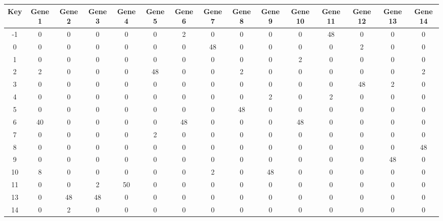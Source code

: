 \begin{tabular}{|c|c|c|c|c|c|c|c|c|c|c|c|c|c|c|}
\hline
Key & Gene 1 & Gene 2 & Gene 3 & Gene 4 & Gene 5 & Gene 6 & Gene 7 & Gene 8 & Gene 9 & Gene 10 & Gene 11 & Gene 12 & Gene 13 & Gene 14 \\
\hline
-1 & 0 & 0 & 0 & 0 & 0 & 2 & 0 & 0 & 0 & 0 & 48 & 0 & 0 & 0 \\
0 & 0 & 0 & 0 & 0 & 0 & 0 & 48 & 0 & 0 & 0 & 0 & 2 & 0 & 0 \\
1 & 0 & 0 & 0 & 0 & 0 & 0 & 0 & 0 & 0 & 2 & 0 & 0 & 0 & 0 \\
2 & 2 & 0 & 0 & 0 & 48 & 0 & 0 & 2 & 0 & 0 & 0 & 0 & 0 & 2 \\
3 & 0 & 0 & 0 & 0 & 0 & 0 & 0 & 0 & 0 & 0 & 0 & 48 & 2 & 0 \\
4 & 0 & 0 & 0 & 0 & 0 & 0 & 0 & 0 & 2 & 0 & 2 & 0 & 0 & 0 \\
5 & 0 & 0 & 0 & 0 & 0 & 0 & 0 & 48 & 0 & 0 & 0 & 0 & 0 & 0 \\
6 & 40 & 0 & 0 & 0 & 0 & 48 & 0 & 0 & 0 & 48 & 0 & 0 & 0 & 0 \\
7 & 0 & 0 & 0 & 0 & 2 & 0 & 0 & 0 & 0 & 0 & 0 & 0 & 0 & 0 \\
8 & 0 & 0 & 0 & 0 & 0 & 0 & 0 & 0 & 0 & 0 & 0 & 0 & 0 & 48 \\
9 & 0 & 0 & 0 & 0 & 0 & 0 & 0 & 0 & 0 & 0 & 0 & 0 & 48 & 0 \\
10 & 8 & 0 & 0 & 0 & 0 & 0 & 2 & 0 & 48 & 0 & 0 & 0 & 0 & 0 \\
11 & 0 & 0 & 2 & 50 & 0 & 0 & 0 & 0 & 0 & 0 & 0 & 0 & 0 & 0 \\
13 & 0 & 48 & 48 & 0 & 0 & 0 & 0 & 0 & 0 & 0 & 0 & 0 & 0 & 0 \\
14 & 0 & 2 & 0 & 0 & 0 & 0 & 0 & 0 & 0 & 0 & 0 & 0 & 0 & 0 \\
\hline
\end{tabular}